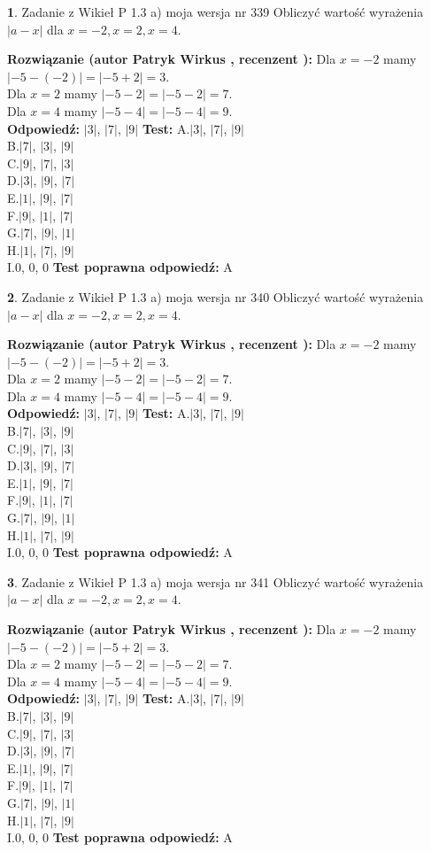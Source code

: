 \documentclass[12pt, a4paper]{article}
\theoremstyle{definition} %
\newtheorem{zad}{}
\newcommand{\zadStart}[1]{\begin{zad}#1\newline}
\newcommand{\zadStop}{\end{zad}}
\newcommand{\rozwStart}[2]{\noindent \textbf{Rozwiązanie (autor #1 , recenzent #2): }\newline}
\newcommand{\rozwStop}{\newline}
\newcommand{\odpStart}{\noindent \textbf{Odpowiedź:}\newline}
\newcommand{\odpStop}{\newline}
\newcommand{\testStart}{\noindent \textbf{Test:}\newline}
\newcommand{\testStop}{\newline}
\newcommand{\kluczStart}{\noindent \textbf{Test poprawna odpowiedź:}\newline}
\newcommand{\kluczStop}{\newline}
\begin{document}
\zadStart{Zadanie z Wikieł P 1.3 a) moja wersja nr 339}
Obliczyć wartość wyrażenia $|a - x|$ dla $x=-2,x=2,x=4$.
\zadStop
\rozwStart{Patryk Wirkus}{}
Dla $x = -2$ mamy $|-5 - (-2)| = |-5 + 2| = 3$.\\
Dla $x = 2$ mamy $|-5 - 2| = |-5 - 2| = 7$.\\
Dla $x = 4$ mamy $|-5 - 4| = |-5 - 4| = 9$.\\
\rozwStop
\odpStart
$|3|$, $|7|$, $|9|$
\odpStop
\testStart
A.$|3|$, $|7|$, $|9|$\\
B.$|7|$, $|3|$, $|9|$\\
C.$|9|$, $|7|$, $|3|$\\
D.$|3|$, $|9|$, $|7|$\\
E.$|1|$, $|9|$, $|7|$\\
F.$|9|$, $|1|$, $|7|$\\
G.$|7|$, $|9|$, $|1|$\\
H.$|1|$, $|7|$, $|9|$\\
I.$0$, $0$, $0$
\testStop
\kluczStart
A
\kluczStop



\zadStart{Zadanie z Wikieł P 1.3 a) moja wersja nr 340}
Obliczyć wartość wyrażenia $|a - x|$ dla $x=-2,x=2,x=4$.
\zadStop
\rozwStart{Patryk Wirkus}{}
Dla $x = -2$ mamy $|-5 - (-2)| = |-5 + 2| = 3$.\\
Dla $x = 2$ mamy $|-5 - 2| = |-5 - 2| = 7$.\\
Dla $x = 4$ mamy $|-5 - 4| = |-5 - 4| = 9$.\\
\rozwStop
\odpStart
$|3|$, $|7|$, $|9|$
\odpStop
\testStart
A.$|3|$, $|7|$, $|9|$\\
B.$|7|$, $|3|$, $|9|$\\
C.$|9|$, $|7|$, $|3|$\\
D.$|3|$, $|9|$, $|7|$\\
E.$|1|$, $|9|$, $|7|$\\
F.$|9|$, $|1|$, $|7|$\\
G.$|7|$, $|9|$, $|1|$\\
H.$|1|$, $|7|$, $|9|$\\
I.$0$, $0$, $0$
\testStop
\kluczStart
A
\kluczStop



\zadStart{Zadanie z Wikieł P 1.3 a) moja wersja nr 341}
Obliczyć wartość wyrażenia $|a - x|$ dla $x=-2,x=2,x=4$.
\zadStop
\rozwStart{Patryk Wirkus}{}
Dla $x = -2$ mamy $|-5 - (-2)| = |-5 + 2| = 3$.\\
Dla $x = 2$ mamy $|-5 - 2| = |-5 - 2| = 7$.\\
Dla $x = 4$ mamy $|-5 - 4| = |-5 - 4| = 9$.\\
\rozwStop
\odpStart
$|3|$, $|7|$, $|9|$
\odpStop
\testStart
A.$|3|$, $|7|$, $|9|$\\
B.$|7|$, $|3|$, $|9|$\\
C.$|9|$, $|7|$, $|3|$\\
D.$|3|$, $|9|$, $|7|$\\
E.$|1|$, $|9|$, $|7|$\\
F.$|9|$, $|1|$, $|7|$\\
G.$|7|$, $|9|$, $|1|$\\
H.$|1|$, $|7|$, $|9|$\\
I.$0$, $0$, $0$
\testStop
\kluczStart
A
\kluczStop
\end{document}
